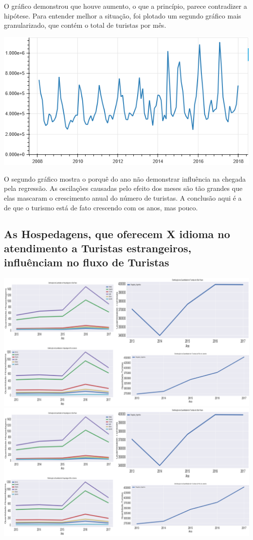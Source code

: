 \documentclass[review]{elsarticle}
\begin{document}
O gráfico demonstrou que houve aumento, o que a princípio, parece contradizer a hipótese. Para entender melhor a situação, foi plotado um segundo gráfico mais granularizado, que contém o total de turistas por mês.

\includegraphics[width=\textwidth]{Segment-Tourist-Month}

O segundo gráfico mostra o porquê do ano não demonstrar influência na chegada pela regressão. As oscilações causadas pelo efeito dos meses são tão grandes que elas mascaram o crescimento anual do número de turistas. A conclusão aqui é a de que o turismo está de fato crescendo com os anos, mas pouco.

\subsection{As Hospedagens, que oferecem X idioma no atendimento a Turistas estrangeiros, influênciam no fluxo de Turistas}

\includegraphics[width=\textwidth]{Segment-Host-Tourist}
\includegraphics[width=\textwidth]{Segment-Host-Tourist-2}
\end{document}
